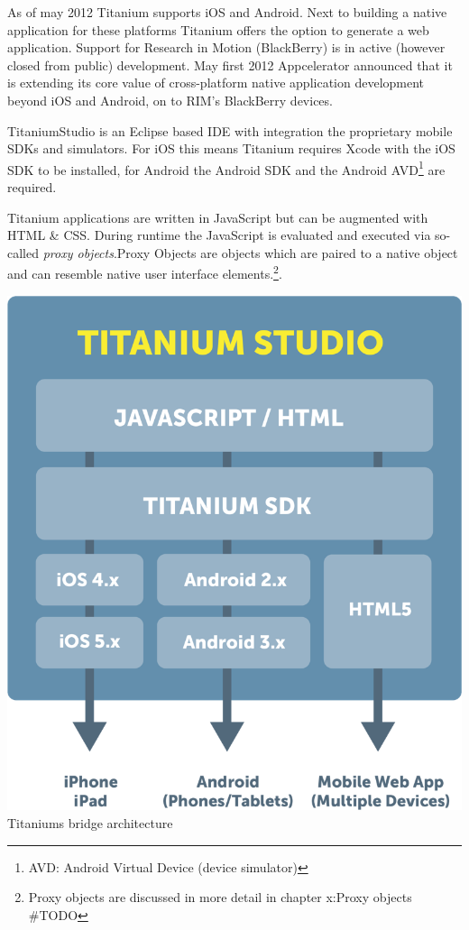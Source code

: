 As of may 2012 Titanium supports iOS and Android. Next to building a native application for these platforms Titanium offers the option to generate a web application. 
Support for Research in Motion (BlackBerry) is in active (however closed from public) development. May first 2012 Appcelerator announced that it is extending its core value of cross-platform native application development beyond iOS and Android, on to RIM's BlackBerry devices.\cite{Asher2012}

TitaniumStudio is an Eclipse based IDE with integration the proprietary mobile SDKs and simulators. For iOS this means Titanium requires Xcode with the iOS SDK to be installed, for Android the Android SDK and the Android AVD\footnote{AVD: Android Virtual Device (device simulator)} are required.

Titanium applications are written in JavaScript but can be augmented with HTML \& CSS. During runtime the JavaScript is evaluated and executed via so-called \emph{proxy objects}.Proxy Objects are objects which are paired to a native object and can resemble native user interface elements.\footnote{Proxy objects are discussed in more detail in chapter x:Proxy objects \#TODO}.


\begin{centering}
	\includegraphics[scale=0.25]{images/titanium_architecture.png}\\{Titaniums bridge architecture\cite{Inc2012a}}\\
\end{centering}

